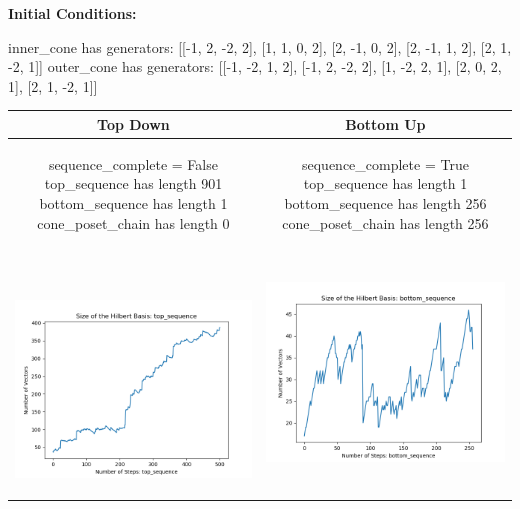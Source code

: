 \documentclass[10pt]{article}
\begin{document}
\textbf{Initial Conditions:}
\begin{SAGE}
inner_cone has generators: 
[[-1, 2, -2, 2], [1, 1, 0, 2], [2, -1, 0, 2], [2, -1, 1, 2], [2, 1, -2, 1]]
outer_cone has generators: 
[[-1, -2, 1, 2], [-1, 2, -2, 2], [1, -2, 2, 1], [2, 0, 2, 1], [2, 1, -2, 1]]

\end{SAGE}
\begin{tabular}{c|c}
\textbf{Top Down} & \textbf{Bottom Up} \\ \hline  
\begin{SAGE}
	sequence_complete = False
	top_sequence has length 901
	bottom_sequence has length 1
	cone_poset_chain has length 0
\end{SAGE} 
&
\begin{SAGE}
	sequence_complete = True
	top_sequence has length 1
	bottom_sequence has length 256
	cone_poset_chain has length 256
\end{SAGE} 
\\ \hline
\
\begin{minipage}{.45\textwidth}
\includegraphics[width=\textwidth]{"DATA/4d/5 generators 2 bound J/top_sequence SIZE"}
\end{minipage} &
\begin{minipage}{.45\textwidth}
\includegraphics[width=\textwidth]{"DATA/4d/5 generators 2 bound J bottomup/bottom_sequence SIZE"}

\end{minipage}
\end{tabular}
\end{document}
